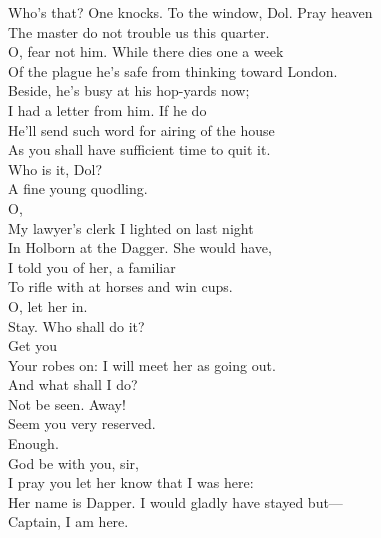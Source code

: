 \documentclass[a4paper,oneside,12pt]{memoir}
\begin{document}
\begin{drama*}
\subtlespeaks Who's that? One knocks. To the window, Dol. Pray heaven\\
The master do not trouble us this quarter.\\
\facespeaks  O, fear not him. While there dies one a week\\
Of the plague he's safe from thinking toward London.\\
Beside, he's busy at his hop-yards now;\\
I had a letter from him. If he do\\
He'll send such word for airing of the house\\
As you shall have sufficient time to quit it.\\
\subtlespeaks Who is it, Dol?\\
\dolspeaks {} A fine young quodling.\\
\facespeaks {} O,\\
My lawyer's clerk I lighted on last night\\
In Holborn at the Dagger. She would have,\\
I told you of her, a familiar\\
To rifle with at horses and win cups.\\
\dolspeaks O, let her in.\\
\subtlespeaks {} Stay. Who shall do it?\\
\facespeaks {}  Get you\\
Your robes on: I will meet her as going out.\\
\dolspeaks And what shall I do?\\
\facespeaks {} Not be seen. Away!\\
Seem you very reserved.\\
\subtlespeaks {} Enough.\\
\facespeaks {}  God be with you, sir,\\
I pray you let her know that I was here:\\
Her name is Dapper. I would gladly have stayed but---\\
\dapperspeaks {} Captain, I am here.\\

\end{drama*}
\end{document}
